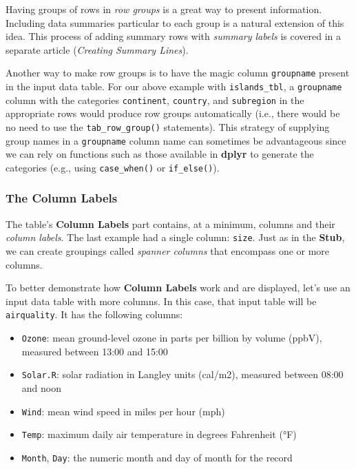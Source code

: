 \documentclass[]{article}
\providecommand{\tightlist}{%
  \setlength{\itemsep}{0pt}\setlength{\parskip}{0pt}}
\begin{document}
Having groups of rows in \emph{row groups} is a great way to present
information. Including data summaries particular to each group is a
natural extension of this idea. This process of adding summary rows with
\emph{summary labels} is covered in a separate article (\emph{Creating
Summary Lines}).

Another way to make row groups is to have the magic column
\texttt{groupname} present in the input data table. For our above
example with \texttt{islands\_tbl}, a \texttt{groupname} column with the
categories \texttt{continent}, \texttt{country}, and \texttt{subregion}
in the appropriate rows would produce row groups automatically (i.e.,
there would be no need to use the \texttt{tab\_row\_group()}
statements). This strategy of supplying group names in a
\texttt{groupname} column name can sometimes be advantageous since we
can rely on functions such as those available in \textbf{dplyr} to
generate the categories (e.g., using \texttt{case\_when()} or
\texttt{if\_else()}).

\subsubsection{The Column Labels}\label{the-column-labels}

The table's \textbf{Column Labels} part contains, at a minimum, columns
and their \emph{column labels}. The last example had a single column:
\texttt{size}. Just as in the \textbf{Stub}, we can create groupings
called \emph{spanner columns} that encompass one or more columns.

To better demonstrate how \textbf{Column Labels} work and are displayed,
let's use an input data table with more columns. In this case, that
input table will be \texttt{airquality}. It has the following columns:

\begin{itemize}
\tightlist
\item
  \texttt{Ozone}: mean ground-level ozone in parts per billion by volume
  (ppbV), measured between 13:00 and 15:00
\item
  \texttt{Solar.R}: solar radiation in Langley units (cal/m2), measured
  between 08:00 and noon
\item
  \texttt{Wind}: mean wind speed in miles per hour (mph)
\item
  \texttt{Temp}: maximum daily air temperature in degrees Fahrenheit
  (°F)
\item
  \texttt{Month}, \texttt{Day}: the numeric month and day of month for
  the record
\end{itemize}
\end{document}
